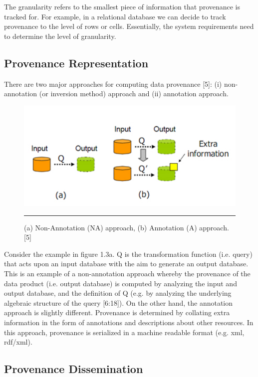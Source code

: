 The granularity refers to the smallest piece of information that provenance is tracked for. For example, in a relational database we can decide to track provenance to the level of rows or cells. Essentially, the system requirements need to determine the level of granularity.


\subsection{Provenance Representation}
There are two major approaches for computing data provenance [5]: (i) non-annotation (or inversion method) approach and (ii) annotation approach.

\begin{figure}[htbp]
	\centering
		\includegraphics{./Figures/figure3.pdf}
		\rule{35em}{0.5pt}
	\caption[Provenance Represantation]{(a) Non-Annotation (NA) approach, (b) Annotation (A) approach. [5]}
	\label{fig:provRepresentation}
\end{figure}

Consider the example in figure 1.3a.  Q is the transformation function (i.e. query) that acts upon an input database with the aim to generate an output database. This is an example of a non-annotation approach whereby the provenance of the data product (i.e. output database) is computed by analyzing the input and output database, and the definition of Q (e.g. by analyzing the underlying algebraic structure of the query [6:18]). On the other hand, the annotation approach is slightly different. Provenance is determined by collating extra information in the form of annotations and descriptions about other resources. In this approach, provenance is serialized in a machine readable format (e.g. xml, rdf/xml).



\subsection{Provenance Dissemination}


